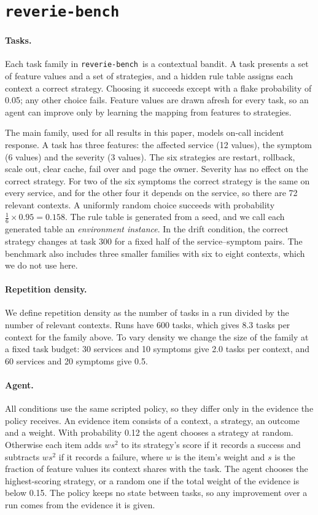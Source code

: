 \documentclass{article}
\newcommand{\bench}{\texttt{reverie-bench}}
\begin{document}
\section{\texttt{reverie-bench}}
\label{sec:bench}

\paragraph{Tasks.}
Each task family in \bench\ is a contextual bandit. A task presents a set of feature
values and a set of strategies, and a hidden rule table assigns each context a correct
strategy. Choosing it succeeds except with a flake probability of 0.05; any other
choice fails. Feature values are drawn afresh for every task, so an agent can improve
only by learning the mapping from features to strategies.

The main family, used for all results in this paper, models on-call incident response.
A task has three features: the affected service (12 values), the symptom (6 values) and
the severity (3 values). The six strategies are restart, rollback, scale out, clear
cache, fail over and page the owner. Severity has no effect on the correct strategy. For
two of the six symptoms the correct strategy is the same on every service, and for the
other four it depends on the service, so there are 72 relevant contexts. A uniformly
random choice succeeds with probability $\frac{1}{6} \times 0.95 = 0.158$. The rule
table is generated from a seed, and we call each generated table an \emph{environment
instance}. In the drift condition, the correct strategy changes at task 300 for a fixed
half of the service--symptom pairs. The benchmark also includes three smaller families
with six to eight contexts, which we do not use here.

\paragraph{Repetition density.}
We define repetition density as the number of tasks in a run divided by the number of
relevant contexts. Runs have 600 tasks, which gives 8.3 tasks per context for the
family above. To vary density we change the size of the family at a fixed task budget:
30 services and 10 symptoms give 2.0 tasks per context, and 60 services and 20 symptoms
give 0.5.

\paragraph{Agent.}
All conditions use the same scripted policy, so they differ only in the evidence the
policy receives. An evidence item consists of a context, a strategy, an outcome and a
weight. With probability 0.12 the agent chooses a strategy at random. Otherwise each
item adds $w s^2$ to its strategy's score if it records a success and subtracts
$w s^2$ if it records a failure, where $w$ is the item's weight and $s$ is the fraction
of feature values its context shares with the task. The agent chooses the
highest-scoring strategy, or a random one if the total weight of the evidence is below
0.15. The policy keeps no state between tasks, so any improvement over a run comes from
the evidence it is given.
\end{document}
